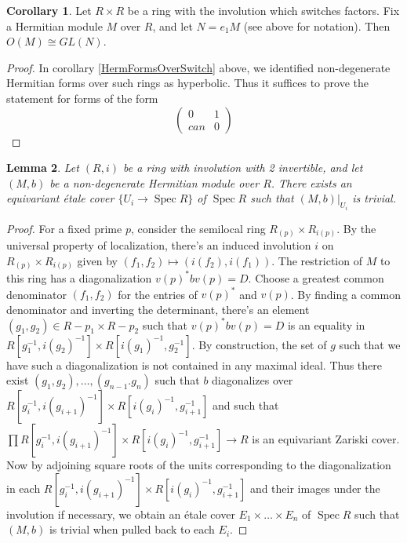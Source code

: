\documentclass[edeposit,fullpage]{uiucthesis2009}
\DeclareMathOperator{\Spec}{Spec}
\theoremstyle{plain}
\newtheorem{lemma}{Lemma}
\numberwithin{lemma}{section}
\theoremstyle{definition}
\newtheorem{corollary}[lemma]{Corollary}
\begin{document}
\begin{corollary}
Let $R \times R$ be a ring with the involution which switches
factors. Fix a Hermitian module $M$ over $R$, and let $N = e_1M$ (see
above for notation). Then
$O(M) \cong GL(N)$.
\end{corollary}

\begin{proof}
In corollary \ref{HermFormsOverSwitch} above, we identified
non-degenerate Hermitian
forms over such rings as hyperbolic. Thus it suffices to prove the
statement for forms of the form 
\[
\begin{pmatrix}
0 & 1\\
can & 0
\end{pmatrix}
\]
\end{proof}

\begin{lemma}
Let $(R,i)$ be a ring with involution with 2 invertible, and let
$(M,b)$ be a non-degenerate Hermitian module over $R$. There exists an equivariant
\'etale cover $\{U_i \rightarrow \Spec R\}$ of $\Spec R$ such that
$(M,b)|_{U_i}$ is trivial.
\end{lemma}

\begin{proof}
For a fixed prime $p$, consider the semilocal ring $R_{(p)} \times
R_{i(p)}$. By the universal property of localization, there's an induced involution $i$ on  $R_{(p)} \times
R_{i(p)}$ given by $(f_1,f_2) \mapsto (i(f_2),i(f_1))$. The
restriction of $M$ to this ring has a diagonalization $v(p)^*bv(p) =
D$. Choose a greatest common denominator $(f_1,f_2)$ for the entries of $v(p)^*$
and $v(p)$. By finding a common denominator and inverting the
determinant, there's an element $(g_1,g_2) \in R-p_1 \times R-p_2$
such that $v(p)^*bv(p) = D$ is an equality in $R[g_1^{-1},i(g_2)^{-1}] \times
R[i(g_1)^{-1},g_2^{-1}]$. By construction, the set of $g$ such that we
have such a diagonalization is not contained in any maximal
ideal. Thus there exist $(g_1,g_2),\dots,(g_{n-1}.g_n)$ such that $b$
diagonalizes over $R[g_i^{-1},i(g_{i+1})^{-1}] \times
R[i(g_i)^{-1},g_{i+1}^{-1}]$ and such that $\prod R[g_i^{-1},i(g_{i+1})^{-1}] \times
R[i(g_i)^{-1},g_{i+1}^{-1}] \rightarrow R$ is an equivariant Zariski
cover. Now by adjoining square roots of the units corresponding to the
diagonalization in each $R[g_i^{-1},i(g_{i+1})^{-1}] \times
R[i(g_i)^{-1},g_{i+1}^{-1}]$ and their images under the
involution if necessary, we obtain an \'etale cover $E_1 \times
\dots \times E_n$ of $\Spec R$ such that $(M,b)$ is trivial when pulled
back to each $E_i$. 
\end{proof}
\end{document}
